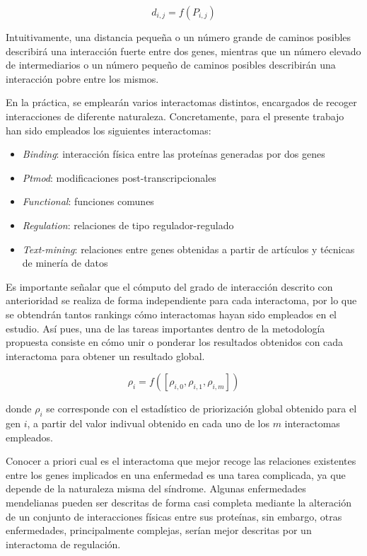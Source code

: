 \begin{equation}
d_{i,j} = f(P_{i,j})
\end{equation}

\medskip
Intuitivamente, una distancia pequeña o un número grande de caminos posibles describirá una interacción fuerte entre dos genes, mientras que un número elevado de intermediarios o un número pequeño de caminos posibles describirán una interacción pobre entre los mismos. 

\medskip
En la práctica, se emplearán varios interactomas distintos, encargados de recoger interacciones de diferente naturaleza. Concretamente, para el presente trabajo han sido empleados los siguientes interactomas:

\begin{itemize}
\item \emph{Binding}: interacción física entre las proteínas generadas por dos genes
\item \emph{Ptmod}: modificaciones post-transcripcionales
\item \emph{Functional}: funciones comunes
\item \emph{Regulation}: relaciones de tipo regulador-regulado
\item \emph{Text-mining}: relaciones entre genes obtenidas a partir de artículos y técnicas de minería de datos
\end{itemize}

\medskip
Es importante señalar que el cómputo del grado de interacción descrito con anterioridad se realiza de forma independiente para cada interactoma, por lo que se obtendrán tantos rankings cómo interactomas hayan sido empleados en el estudio. Así pues, una de las tareas importantes dentro de la metodología propuesta consiste en cómo unir o ponderar los resultados obtenidos con cada interactoma para obtener un resultado global.

\begin{equation}
\rho_{i} = f([\rho_{i,0},\rho_{i,1},\rho_{i,m}])
\end{equation}

donde $\rho_{i}$ se corresponde con el estadístico de priorización global obtenido para el gen $i$, a partir del valor indivual obtenido en cada uno de los $m$ interactomas empleados.

\medskip
Conocer a priori cual es el interactoma que mejor recoge las relaciones existentes entre los genes implicados en una enfermedad es una tarea complicada, ya que depende de la naturaleza misma del síndrome. Algunas enfermedades mendelianas pueden ser descritas de forma casi completa mediante la alteración de un conjunto de interacciones físicas entre sus proteínas, sin embargo, otras enfermedades, principalmente complejas, serían mejor descritas por un interactoma de regulación. 

